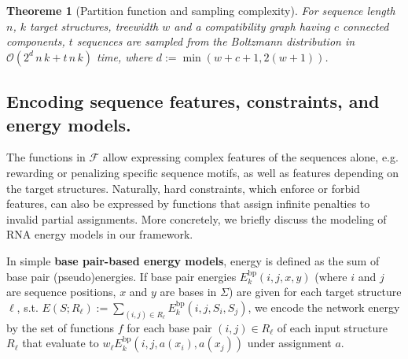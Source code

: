 \documentclass{bioinfo}
\newtheorem{theorem}{Theoreme}
\newcommand{\network}{\mathcal{N}}
\newcommand{\val}{a} %
\newcommand{\energy}[1]{\operatorname{e}_{#1}}
\newcommand{\F}{\mathcal{F}}
\newcommand{\Ebp}[2]{E^{\textrm{bp}}_{#1}(#2)}
\newcommand{\Ehp}[1]{E^{\textrm{hp}}(#1)}
\newcommand{\Eint}[1]{E^{\textrm{int}}(#1)}
\newcommand{\Def}[1]{{\bf #1}}
\begin{document}
\begin{theorem}[Partition function and sampling complexity]
  For sequence length $n$, $k$ target structures, treewidth $w$ and
  a compatibility graph having $c$ connected components, $t$ sequences
  are sampled from the Boltzmann distribution  in
  $\mathcal{O}( 2^d\, n\, k  + t\, n\, k )$ time, where $d:=\min(w+c+1,2(w+1))$.
\end{theorem}

\subsection{Encoding sequence features, constraints, and energy
  models.}\label{sec:energy_models}

The functions in $\F$ allow expressing complex features of the
sequences alone, e.g. rewarding or penalizing specific sequence
motifs, as well as features depending on the target structures.
Naturally, hard
constraints, which enforce or forbid features, can also be expressed by functions that
assign infinite penalties to invalid partial assignments. More concretely, we briefly 
discuss the modeling of RNA energy models in our
framework.

In simple \Def{base pair-based energy models}, energy is defined as the sum of base pair (pseudo)energies. If base pair energies $\Ebp{k}{i,j,x,y}$ (where
$i$ and $j$ are sequence positions, $x$ and $y$ are bases in $\Sigma$)
are given for each target structure $\ell$, s.t.
$ E(S;R_\ell) := \sum_{(i,j)\in R_\ell} \Ebp{k}{i,j,S_i,S_j}$, we
encode the network energy by the set of functions
$f$ for each base pair $(i,j)\in R_\ell$ of each input structure
$R_\ell$ that evaluate to $w_\ell \Ebp{k}{i,j,\val(x_i),\val(x_j)}$
under assignment $\val$.

\end{document}
